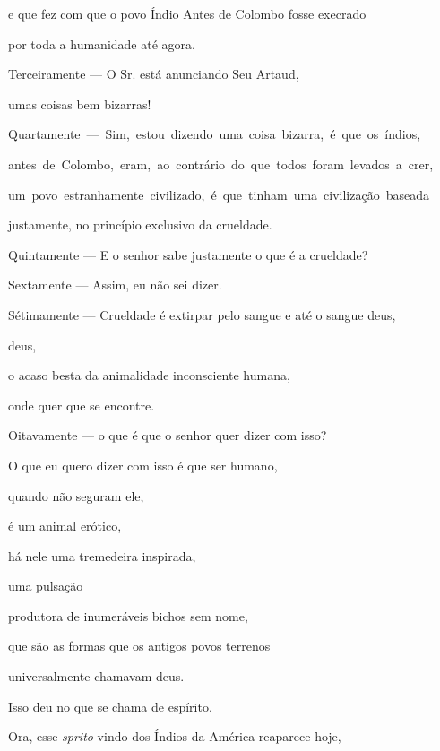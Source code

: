e que fez com que o povo Índio Antes de Colombo fosse execrado

por toda a humanidade até agora.




Terceiramente --- O Sr. está anunciando Seu Artaud,

umas coisas bem bizarras!



\mbox{Quartamente --- Sim, estou dizendo uma coisa bizarra, é que os índios,}

\mbox{antes de Colombo, eram, ao contrário do que todos foram levados a crer,}

\mbox{um povo estranhamente civilizado, é que tinham uma civilização baseada}

justamente, no princípio exclusivo da crueldade.


Quintamente --- E o senhor sabe justamente o que é a crueldade?


Sextamente --- Assim, eu não sei dizer.

Sétimamente --- Crueldade é extirpar pelo sangue e até o sangue deus,

deus,

o acaso besta da animalidade inconsciente humana, 

onde quer que se encontre.


Oitavamente --- o que é que o senhor quer dizer com isso?


O que eu quero dizer com isso é que ser humano,

quando não seguram ele,

é um animal erótico,

há nele uma tremedeira inspirada,

uma pulsação

produtora de inumeráveis bichos sem nome,

que são as formas que os antigos povos terrenos

universalmente chamavam deus.

Isso deu no que se chama de espírito.

Ora, esse \emph{sprito} vindo dos Índios da América reaparece hoje,


